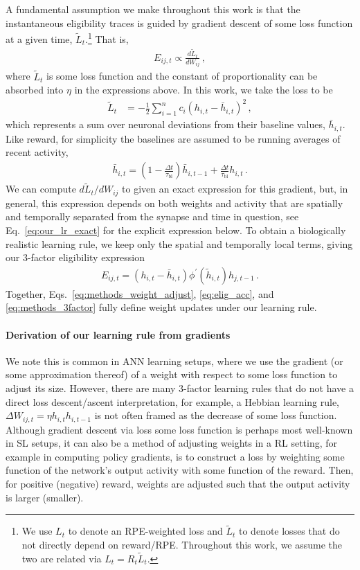 \documentclass[
  journal=medium,
  manuscript=preprint,
  year=2026
]{aind-preprint}
\begin{document}
A fundamental assumption we make throughout this work is that the instantaneous eligibility traces is guided by gradient descent of some loss function at a given time, $\tilde{L}_t$.\footnote{We use $L_t$ to denote an RPE-weighted loss and $\tilde{L}_t$ to denote losses that do not directly depend on reward/RPE.
Throughout this work, we assume the two are related via $L_t = R_t \tilde{L}_t$.}
That is,
\begin{align}
    E_{ij,t} \propto \frac{d\tilde{L}_t}{dW_{ij}}\,,
\end{align}
where $\tilde{L}_t$ is some loss function and the constant of proportionality can be absorbed into $\eta$ in the expressions above.
In this work, we take the loss to be 
\begin{align}
    \tilde{L}_t &= -\frac{1}{2}\sum_{i=1}^n c_i \left(h_{i,t} - \bar{h}_{i,t}\right)^2\,,
\end{align}
which represents a sum over neuronal deviations from their baseline values, $\bar{h}_{i,t}$. 
Like reward, for simplicity the baselines are assumed to be running averages of recent activity,
\begin{align}
    \bar{h}_{i,t} = \left(1-\frac{\Delta t}{\tau_\text{bl}}\right) \bar{h}_{i,t-1} + \frac{\Delta t}{\tau_\text{bl}} h_{i,t}\,.
\end{align}
We can compute $d\tilde{L}_t / dW_{ij}$ to given an exact expression for this gradient, but, in general, this expression depends on both weights and activity that are spatially and temporally separated from the synapse and time in question, see Eq.~\eqref{eq:our_lr_exact} for the explicit expression below.
To obtain a biologically realistic learning rule, we keep only the spatial and temporally local terms, giving our 3-factor eligibility expression
\begin{align}
    \label{eq:methods_3factor}
    E_{ij,t} = \left(h_{i,t} - \bar{h}_{i,t} \right)\phi^\prime\left(\tilde{h}_{i,t}\right) h_{j,t-1}\,.
\end{align}
Together, Eqs.~\eqref{eq:methods_weight_adjust}, \eqref{eq:elig_acc}, and \eqref{eq:methods_3factor} fully define weight updates under our learning rule.

\paragraph{Derivation of our learning rule from gradients}

We note this is common in ANN learning setups, where we use the gradient (or some approximation thereof) of a weight with respect to some loss function to adjust its size.
However, there are many 3-factor learning rules that do not have a direct loss descent/ascent interpretation, for example, a Hebbian learning rule, $\Delta W_{ij,t} = \eta h_{i,t} h_{i,t-1}$ is not often framed as the decrease of some loss function.
Although gradient descent via loss some loss function is perhaps most well-known in SL setups, it can also be a method of adjusting weights in a RL setting, for example in computing policy gradients, is to construct a loss by weighting some function of the network's output activity with some function of the reward.
Then, for positive (negative) reward, weights are adjusted such that the output activity is larger (smaller).
\end{document}
